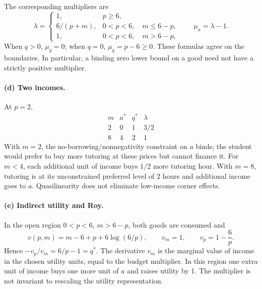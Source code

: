 \documentclass[11pt,a4paper]{article}
\begin{document}
The corresponding multipliers are
\[
 \lambda=
 \begin{cases}
 1,&p\ge6,\\
 6/(p+m),&0<p<6,\quad m\le6-p,\\
 1,&0<p<6,\quad m>6-p,
 \end{cases}\qquad
 \mu_a=\lambda-1.
\]
When $q>0$, $\mu_q=0$; when $q=0$, $\mu_q=p-6\ge0$. These formulas agree on the boundaries. In particular, a binding zero lower bound on a good need not have a strictly positive multiplier.
\paragraph{(d) Two incomes.} At $p=2$,
\[
 \begin{array}{c|ccc}
 m&a^*&q^*&\lambda\\\hline
 2&0&1&3/2\\
 8&4&2&1
 \end{array}
\]
With $m=2$, the no-borrowing/nonnegativity constraint on $a$ binds; the student would prefer to buy more tutoring at these prices but cannot finance it. For $m<4$, each additional unit of income buys $1/2$ more tutoring hour. With $m=8$, tutoring is at its unconstrained preferred level of 2 hours and additional income goes to $a$. Quasilinearity does not eliminate low-income corner effects.
\paragraph{(e) Indirect utility and Roy.} In the open region $0<p<6$, $m>6-p$, both goods are consumed and
\[
 v(p,m)=m-6+p+6\log(6/p),\qquad
 v_m=1,\qquad v_p=1-\frac6p.
\]
Hence $-v_p/v_m=6/p-1=q^*$. The derivative $v_m$ is the marginal value of income in the chosen utility units, equal to the budget multiplier. In this region one extra unit of income buys one more unit of $a$ and raises utility by 1. The multiplier is not invariant to rescaling the utility representation.
\end{document}
